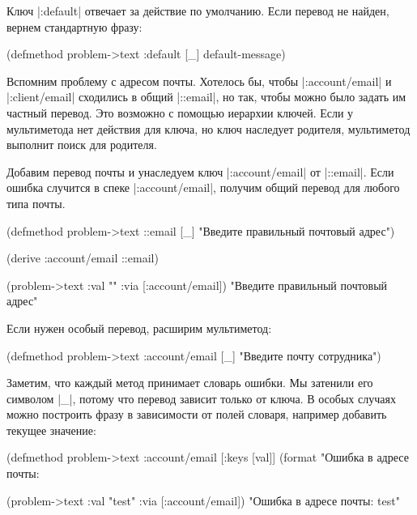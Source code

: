 Ключ \spverb|:default| отвечает за действие по умолчанию. Если перевод не
найден, вернем стандартную фразу:

\begin{english}
  \begin{clojure}
(defmethod problem->text :default [_]
  default-message)
  \end{clojure}
\end{english}

Вспомним проблему с адресом почты. Хотелось бы, чтобы \spverb|:account/email| и
\spverb|:client/email| сходились в общий \spverb|::email|, но так, чтобы можно
было задать им частный перевод. Это возможно с помощью иерархии ключей. Если у
мультиметода нет действия для ключа, но ключ наследует родителя, мультиметод
выполнит поиск для родителя.

Добавим перевод почты и унаследуем ключ \spverb|:account/email| от
\spverb|::email|. Если ошибка случится в спеке \spverb|:account/email|, получим
общий перевод для любого типа почты.

  \begin{clojure}
(defmethod problem->text ::email [_]
  "Введите правильный почтовый адрес")

(derive :account/email ::email)

(problem->text {:val "" :via [:account/email]})
"Введите правильный почтовый адрес"
  \end{clojure}

Если нужен особый перевод, расширим мультиметод:

  \begin{clojure}
(defmethod problem->text :account/email [_]
  "Введите почту сотрудника")
  \end{clojure}

Заметим, что каждый метод принимает словарь ошибки. Мы затенили его символом
\spverb|_|, потому что перевод зависит только от ключа. В особых случаях можно
построить фразу в зависимости от полей словаря, например добавить текущее
значение:

  \begin{clojure}
(defmethod problem->text :account/email
  [{:keys [val]}]
  (format "Ошибка в адресе почты: %

(problem->text {:val "test" :via [:account/email]})
"Ошибка в адресе почты: test"
  \end{clojure}

